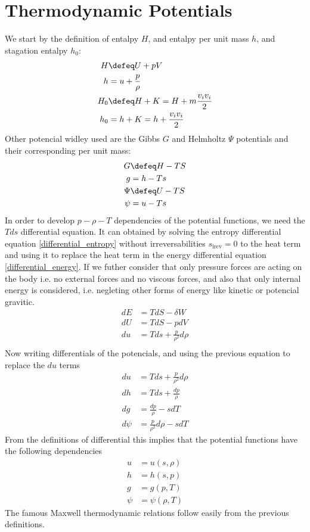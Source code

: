 \section{Thermodynamic Potentials}
We start by the definition of entalpy $H$, and entalpy per unit mass $h$, and stagation entalpy $h_0$: 
\begin{align}
   H &\defeq U + pV \\  
   h & =  u + \frac{p}{\rho}\\
   H_0 &\defeq H + K = H + m\frac{v_i v_i}{2}\\
   h_0 &= h + K = h + \frac{v_i v_i}{2}
\end{align}
Other potencial widley used are the Gibbs $G$ and Helmholtz $\Psi$ potentials and their corresponding per unit mass:
\begin{align}
   G &\defeq H - TS \\  
   g &= h - Ts \\  
   \Psi &\defeq U - TS \\  
   \psi &= u - Ts 
\end{align}
In order to develop $p-\rho-T$ dependencies of the potential functions, we need the $Tds$ differential equation. It can obtained by solving the entropy differential equation \eqref{differential_entropy} without irreversabilities $s_{\text{irev}}=0$ to the heat term and using it to replace the heat term in the energy differential equation \eqref{differential_energy}. If we futher consider that only pressure forces are acting on the body i.e. no external forces and no viscous forces, and also that only internal energy is considered, i.e. negleting other forms of energy like kinetic or potencial gravitic. 
\begin{align}
    dE &= TdS - \delta W \\  
    dU &= TdS - pdV\\  
    du &= Tds + \frac{p}{\rho^2}d\rho \\
\end{align}
Now writing differentials of the potencials, and using the previous equation to replace the $du$ terms
\begin{align}
   du &= Tds + \frac{p}{\rho^2}d\rho \\
   dh & =  Tds + \frac{dp}{\rho}\\
   dg &= \frac{dp}{\rho} - sdT \\  
   d\psi &= \frac{p}{\rho^2}d\rho - sdT 
\end{align}
From the definitions of differential this implies that the potential functions have the following dependencies
\begin{align}
   u  & = u(s,\rho)  \\
   h  & = h(s,p)       \\
   g  & = g(p,T)       \\
   \psi & = \psi(\rho,T)
\end{align}
The famous Maxwell thermodynamic relations follow easily from the previous definitions.


